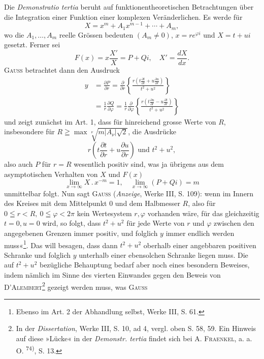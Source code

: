 \clearpage{}
\noindent\hspace*{\parindent}Die \textit{Demonstratio tertia} beruht auf funktionentheoretischen Betrachtungen
über die Integration einer Funktion einer komplexen Veränderlichen. Es
werde für
\[
X=x^m+A_1x^{m-1}+\cdots+A_m,
\]
wo die \(A_1,\ldots,A_m\) reelle Grössen bedeuten \((A_m\ne0)\), \(x=re^{\varphi i}\) und \(X=t+ui\)
gesetzt. Ferner sei
\[
F(x)=x\frac{X'}{X}=P+Qi,\quad X'=\frac{dX}{dx}.
\]
\textsc{Gauss} betrachtet dann den Ausdruck
\[
\begin{aligned}
y&=\frac{\partial P}{\partial r}=\frac{\partial}{\partial r}
\left\{\frac{r\left(t\frac{\partial t}{\partial r}+u\frac{\partial u}{\partial r}\right)}{t^2+u^2}\right\}\\
&=\frac1r\frac{\partial Q}{\partial\varphi}=\frac1r\frac{\partial}{\partial\varphi}
\left\{\frac{r\left(t\frac{\partial u}{\partial r}-u\frac{\partial t}{\partial r}\right)}{t^2+u^2}\right\}
\end{aligned}
\]
und zeigt zunächst im Art. 1, dass für hinreichend grosse Werte von \(R\), insbesondere
für \(R\geqq\max\sqrt[\nu]{m|A_\nu|\sqrt2}\), die Ausdrücke
\[
r\left(t\frac{\partial t}{\partial r}+u\frac{\partial u}{\partial r}\right)\text{ und }t^2+u^2,
\]
also auch \(P\) für \(r=R\) wesentlich positiv sind, was ja übrigens aus dem
asymptotischen Verhalten von \(X\) und \(F(x)\)
\[
\lim_{x\to\infty}X\mathbin{.}x^{-m}=1,\quad\lim_{x\to\infty}(P+Qi)=m
\]
unmittelbar folgt. Nun sagt \textsc{Gauss} (\textit{Anzeige}, Werke III, S. 109): wenn im
Innern des Kreises mit dem Mittelpunkt \(0\) und dem Halbmesser \(R\), also für
\(0\leqq r<R,\ 0\leqq\varphi<2\pi\) kein Wertesystem \(r,\varphi\) vorhanden wäre, für das
gleichzeitig \(t=0,u=0\) wird, so folgt, dass \(t^2+u^2\) für jede Werte von
\(r\) und \(\varphi\) zwischen den angegebenen Grenzen immer positiv, und folglich \(y\)
immer endlich werden muss«\footnote{Ebenso im Art. 2 der Abhandlung selbst, Werke III, S. 61.}. Das will besagen, dass dann \(t^2+u^2\) oberhalb
einer angebbaren positiven Schranke und folglich \(y\) unterhalb einer ebensolchen
Schranke liegen muss. Die auf \(t^2+u^2\) bezügliche Behauptung bedarf
aber noch eines besondern Beweises, indem nämlich im Sinne des vierten Einwandes
gegen den Beweis von \textsc{D'Alembert}\footnote{In der \textit{Dissertation}, Werke III, S. 10, ad 4, vergl. oben S. 58, 59. Ein Hinweis auf diese »Lücke« in der \textit{Demonstr. tertia} findet sich bei A. \textsc{Fraenkel}, a. a. O. \textsuperscript{74)}, S. 13.} gezeigt werden muss, was \textsc{Gauss}

